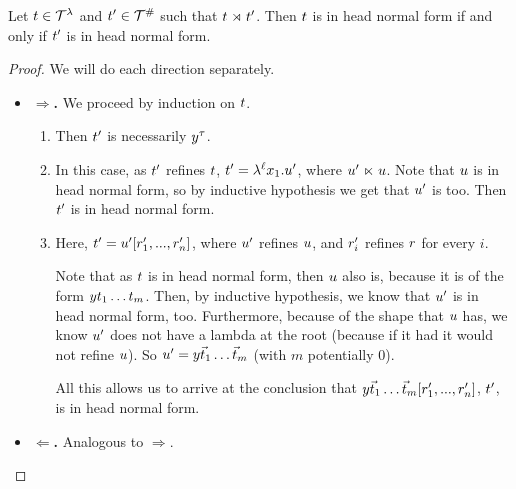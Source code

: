 \begin{lemma}
Let $t \in \mathcal{T}^{\lambda}$ and $t' \in \mathcal{T}^{\mathtt{\#}}$ such that $t \mathrel{\rtimes}  t'$.
Then $t$ is in head normal form if and only if $t'$ is in head normal form.
\end{lemma}
\begin{proof}
  We will do each direction separately.
\begin{itemize}
  \item[]{\bf $\Rightarrow$.}
    We proceed by induction on $t$.
    \begin{enumerate}
    \item {}
      Then $t'$ is necessarily $y^\tau$.
    \item {}
      In this case, as $t'$ refines $t$, $t' = \lambda^{\ell} x_1. u'$,
        where $u' \mathrel{\ltimes} u$.
      Note that $u$ is in head normal form, so by inductive hypothesis we get that $u'$ is too.
        Then $t'$ is in head normal form.
    \item {}
      Here, $t' = u' [r'_1, ..., r'_n]$,
        where $u'$ refines $u$, and $r'_i$ refines $r$ for every $i$.


      Note that as $t$ is in head normal form, then $u$ also is,
        because it is of the form $y t_1 \hdots t_m$.
        Then, by inductive hypothesis, we know that $u'$ is in head normal form, too.
        Furthermore, because of the
        shape that $u$ has, we know $u'$ does not have a lambda at the root
        (because if it had it would not refine $u$).
        So $u' = y \vec{t}_1 \hdots \vec{t}_m$ (with $m$ potentially $0$).

      All this allows us to arrive at the conclusion that
        $y \vec{t}_1 \hdots \vec{t}_m [r'_1, ..., r'_n]$, \ie $t'$, is in head normal form.
    \end{enumerate}

  \item[]{\bf $\Leftarrow$.} Analogous to $\Rightarrow$.
\end{itemize}
\end{proof}


